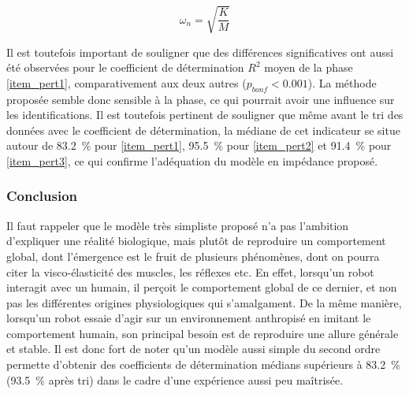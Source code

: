 \begin{equation} \label{eq_impedance_model_natural_pulse}
	\omega_n = \sqrt{\frac{K}{M}}
\end{equation}

Il est toutefois important de souligner que des différences significatives ont aussi été observées pour le coefficient de détermination $R^2$ moyen de la phase \cref{item_pert1}, comparativement aux deux autres ($p_{bonf}<0.001$). La méthode proposée semble donc sensible à la phase, ce qui pourrait avoir une influence sur les identifications. Il est toutefois pertinent de souligner que même avant le tri des données avec le coefficient de détermination, la médiane de cet indicateur se situe autour de \SI{83.2}{\percent} pour \cref{item_pert1}, \SI{95.5}{\percent} pour \cref{item_pert2} et \SI{91.4}{\percent} pour \cref{item_pert3}, ce qui confirme l'adéquation du modèle en impédance proposé. 

\subsubsection{Conclusion}

Il faut rappeler que le modèle très simpliste proposé n'a pas l'ambition d'expliquer une réalité biologique, mais plutôt de reproduire un comportement global, dont l'émergence est le fruit de plusieurs phénomènes, dont on pourra citer la visco-élasticité des muscles, les réflexes etc. En effet, lorsqu'un robot interagit avec un humain, il perçoit le comportement global de ce dernier, et non pas les différentes origines physiologiques qui s'amalgament. De la même manière, lorsqu'un robot essaie d'agir sur un environnement anthropisé en imitant le comportement humain, son principal besoin est de reproduire une allure générale et stable. Il est donc fort de noter qu'un modèle aussi simple du second ordre permette d'obtenir des coefficients de détermination médians supérieurs à \SI{83.2}{\percent} (\SI{93.5}{\percent} après tri) dans le cadre d'une expérience aussi peu maîtrisée.

